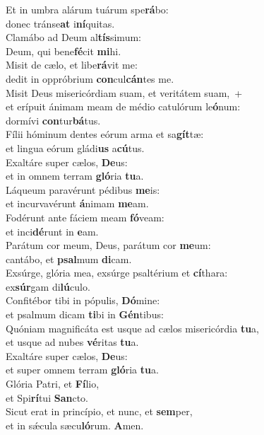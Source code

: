 \evenverse Et in umbra alárum tuárum spe\textbf{rá}bo:~\*\\
\evenverse donec tránse\textbf{at} i\textbf{ní}quitas.\\
\oddverse Clamábo ad Deum al\textbf{tís}simum:~\*\\
\oddverse Deum, qui bene\textbf{fé}cit \textbf{mi}hi.\\
\evenverse Misit de cælo, et libe\textbf{rá}vit me:~\*\\
\evenverse dedit in oppróbrium \textbf{con}cul\textbf{cán}tes me.\\
\oddverse Misit Deus misericórdiam suam, et veritátem suam,~+\\
\oddverse  et erípuit ánimam meam de médio catulórum le\textbf{ó}num:~\*\\
\oddverse dormívi \textbf{con}tur\textbf{bá}tus.\\
\evenverse Fílii hóminum dentes eórum arma et sa\textbf{gít}tæ:~\*\\
\evenverse et lingua eórum gládi\textbf{us} a\textbf{cú}tus.\\
\oddverse Exaltáre super cælos, \textbf{De}us:~\*\\
\oddverse et in omnem terram \textbf{gló}ria \textbf{tu}a.\\
\evenverse Láqueum paravérunt pédibus \textbf{me}is:~\*\\
\evenverse et incurvavérunt \textbf{á}nimam \textbf{me}am.\\
\oddverse Fodérunt ante fáciem meam \textbf{fó}veam:~\*\\
\oddverse et inci\textbf{dé}runt in \textbf{e}am.\\
\evenverse Parátum cor meum, Deus, parátum cor \textbf{me}um:~\*\\
\evenverse cantábo, et \textbf{psal}mum \textbf{di}cam.\\
\oddverse Exsúrge, glória mea, exsúrge psaltérium et \textbf{cí}thara:~\*\\
\oddverse ex\textbf{súr}gam di\textbf{lú}culo.\\
\evenverse Confitébor tibi in pópulis, \textbf{Dó}mine:~\*\\
\evenverse et psalmum dicam \textbf{ti}bi in \textbf{Gén}tibus:\\
\oddverse Quóniam magnificáta est usque ad cælos misericórdia \textbf{tu}a,~\*\\
\oddverse et usque ad nubes \textbf{vé}ritas \textbf{tu}a.\\
\evenverse Exaltáre super cælos, \textbf{De}us:~\*\\
\evenverse et super omnem terram \textbf{gló}ria \textbf{tu}a.\\
\oddverse Glória Patri, et \textbf{Fí}lio,~\*\\
\oddverse et Spi\textbf{rí}tui \textbf{San}cto.\\
\evenverse Sicut erat in princípio, et nunc, et \textbf{sem}per,~\*\\
\evenverse et in sǽcula sæcu\textbf{ló}rum. \textbf{A}men.\\
